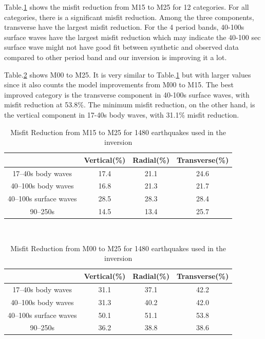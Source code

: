 \documentclass[extra,mreferee]{gji}
\begin{document}
Table.\ref{table:misfit_reduction_M15_M25} shows the misfit reduction from M15 to M25
for 12 categories. For all categories, there is a significant misfit reduction. Among
the three components, transverse have the largest misfit reduction. For the 4 period bands,
40-100s surface waves have the largest misfit reduction which may indicate the 40-100 sec
surface wave might not have good fit between synthetic and observed data compared to
other period band and our inversion is improving it a lot.

Table.\ref{table:misfit_reduction_M00_M25} shows M00 to M25. It is very similar to
Table.\ref{table:misfit_reduction_M15_M25} but with larger values since it also
counts the model improvements from M00 to M15. The best improved category is
the transverse component in 40-100s surface waves, with misfit reduction at
53.8\%. The minimum misfit reduction, on the other hand, is the vertical component
in 17-40s body waves, with 31.1\% misfit reduction.

\begin{table}[!htb]
  \centering
  \begin{tabular}{|c|c|c|c|}
    \hline
    ~          &  Vertical(\%) & Radial(\%) &  Transverse(\%) \\
    \hline
    17--40s  body waves    &   17.4   &       21.1 &       24.6 \\
    40--100s body waves    &   16.8   &       21.3 &       21.7 \\
    40--100s surface waves &   28.5   &       28.3 &       28.4 \\
    90--250s               &   14.5   &       13.4 &       25.7 \\
    \hline
  \end{tabular}\\
  \caption{Misfit Reduction from M15 to M25 for 1480 earthquakes used in the inversion}
  \label{table:misfit_reduction_M15_M25}
\end{table}

\begin{table}[!htb]
  \centering
  \begin{tabular}{|c|c|c|c|}
    \hline
     ~          &  Vertical(\%) & Radial(\%) &  Transverse(\%) \\
    \hline
    17--40s body waves     &    31.1    &       37.1 &       42.2 \\
    40--100s body waves    &    31.3    &       40.2 &       42.0 \\
    40--100s surface waves &    50.1    &       51.1 &       53.8 \\
    90--250s               &    36.2    &       38.8 &       38.6 \\
    \hline
  \end{tabular}\\
  \caption{Misfit Reduction from M00 to M25 for 1480 earthquakes used in the inversion}
  \label{table:misfit_reduction_M00_M25}
\end{table}
\end{document}
